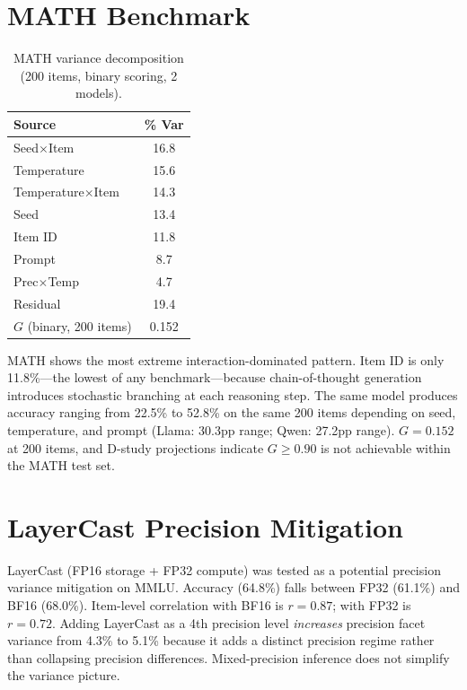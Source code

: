 \documentclass[11pt,twocolumn]{article}
\newcommand{\Gcoeff}{\ensuremath{G}}
\newcommand{\pct}{\%}
\begin{document}
\section{MATH Benchmark}

\begin{table}[h]
\centering
\caption{MATH variance decomposition (200 items, binary scoring, 2 models).}
\begin{tabular}{@{}lc@{}}
\toprule
\textbf{Source} & \textbf{\pct{} Var} \\
\midrule
Seed$\times$Item        & 16.8 \\
Temperature             & 15.6 \\
Temperature$\times$Item & 14.3 \\
Seed                    & 13.4 \\
Item ID                 & 11.8 \\
Prompt                  &  8.7 \\
Prec$\times$Temp        &  4.7 \\
Residual                & 19.4 \\
\midrule
$\Gcoeff$ (binary, 200 items) & 0.152 \\
\bottomrule
\end{tabular}
\end{table}

MATH shows the most extreme interaction-dominated pattern. Item ID is only 11.8\pct{}---the lowest of any benchmark---because chain-of-thought generation introduces stochastic branching at each reasoning step. The same model produces accuracy ranging from 22.5\pct{} to 52.8\pct{} on the same 200 items depending on seed, temperature, and prompt (Llama: 30.3pp range; Qwen: 27.2pp range). $\Gcoeff=0.152$ at 200 items, and D-study projections indicate $\Gcoeff \geq 0.90$ is not achievable within the MATH test set.

\section{LayerCast Precision Mitigation}

LayerCast (FP16 storage + FP32 compute) was tested as a potential precision variance mitigation on MMLU. Accuracy (64.8\pct{}) falls between FP32 (61.1\pct{}) and BF16 (68.0\pct{}). Item-level correlation with BF16 is $r=0.87$; with FP32 is $r=0.72$. Adding LayerCast as a 4th precision level \emph{increases} precision facet variance from 4.3\pct{} to 5.1\pct{} because it adds a distinct precision regime rather than collapsing precision differences. Mixed-precision inference does not simplify the variance picture.
\end{document}
